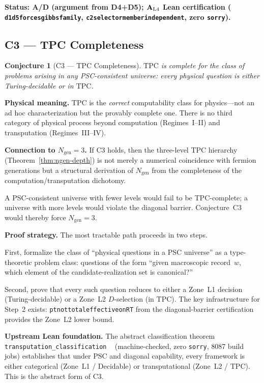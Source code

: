 \documentclass[12pt,letterpaper]{article}
\newtheorem{conjecture}[theorem]{Conjecture}
\newcommand{\TPC}{\mathrm{TPC}}
\newcommand{\ngen}{N_{\mathrm{gen}}}
\newcommand{\catAL}{\ensuremath{\textbf{A}_{\rm L4}}}
\newcommand{\catAD}{\textbf{A/D}}
\newcommand{\lean}[1]{%
  \penalty-100
  \begingroup\def\_{\textunderscore\allowbreak}\texttt{#1}\endgroup}
\begin{document}
\noindent\textbf{Status: \catAD{} (argument from D4+D5); \catAL{} Lean certification
(\lean{d1\_d5\_forces\_gibbs\_family}, \lean{c2\_selector\_member\_independent},
zero \texttt{sorry}).}

\subsection{C3 --- TPC Completeness}
\label{sec:C3}

\begin{conjecture}[C3 --- TPC Completeness]
\label{conj:C3}
$\TPC$ is complete for the class of problems arising in any PSC-consistent universe:
every physical question is either Turing-decidable or in $\TPC$.
\end{conjecture}

\noindent\textbf{Physical meaning.}  $\TPC$ is the \emph{correct} computability
class for physics---not an ad hoc characterization but the provably complete one.
There is no third category of physical process beyond computation (Regimes~I--II)
and transputation (Regimes~III--IV).

\noindent\textbf{Connection to $\ngen = 3$.}  If C3 holds, then the three-level
TPC hierarchy (Theorem~\ref{thm:ngen-depth}) is not merely a numerical coincidence
with fermion generations but a structural derivation of $\ngen$ from the
completeness of the computation/transputation dichotomy.

A PSC-consistent universe with fewer levels would fail to be TPC-complete; a universe
with more levels would violate the diagonal barrier.  Conjecture~C3 would thereby
force $\ngen = 3$.

\noindent\textbf{Proof strategy.}  The most tractable path proceeds in two steps.

First, formalize the class of ``physical questions in a PSC universe'' as a
type-theoretic problem class: questions of the form ``given macroscopic record~$w$,
which element of the candidate-realization set is canonical?''

Second, prove that every such question reduces to either a Zone~L1 decision
(Turing-decidable) or a Zone~L2 $D$-selection (in $\TPC$).  The key infrastructure
for Step~2 exists: \lean{pt\_not\_total\allowbreak\_effective\_on\_RT} from the diagonal-barrier
certification provides the Zone~L2 lower bound.

\noindent\textbf{Upstream Lean foundation.}
The abstract classification theorem \texttt{transputation\-\_classification}%
~\cite{SpivackNEMS76} (machine-checked, zero \texttt{sorry}, 8087 build jobs)
establishes that under $\mathrm{PSC}$ and diagonal capability, every framework is
either categorical (Zone~L1 / Decidable) or transputational (Zone~L2 / TPC).
This is the abstract form of C3.
\end{document}
